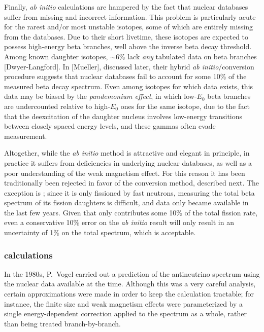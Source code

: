 \documentclass[../thesis.tex]{subfiles}
\begin{document}
Finally, \emph{ab initio} calculations are hampered by the fact that nuclear databases suffer from missing and incorrect information. This problem is particularly acute for the rarest and/or most unstable isotopes, some of which are entirely missing from the databases. Due to their short livetime, these isotopes are expected to possess high-energy beta branches, well above the inverse beta decay threshold. Among known daughter isotopes, $\sim$6\% lack \emph{any} tabulated data on beta branches [Dwyer-Langford]. In [Mueller], discussed later, their hybrid \emph{ab initio}/conversion procedure suggests that nuclear databases fail to account for some 10\% of the measured beta decay spectrum. Even among isotopes for which data exists, this data may be biased by the \emph{pandemonium effect}, in which low-$E_0$ beta branches are undercounted relative to high-$E_0$ ones for the same isotope, due to the fact that the deexcitation of the daughter nucleus involves low-energy transitions between closely spaced energy levels, and these gammas often evade measurement.

Altogether, while the \emph{ab initio} method is attractive and elegant in principle, in practice it suffers from deficiencies in underlying nuclear databases, as well as a poor understanding of the weak magnetism effect. For this reason it has been traditionally been rejected in favor of the conversion method, described next. The exception is \ureight; since it is only fissioned by fast neutrons, measuring the total beta spectrum of its fission daughters is difficult, and data only became available in the last few years. Given that \ureight only contributes some 10\% of the total fission rate, even a conservative 10\% error on the \emph{ab initio} result will only result in an uncertainty of 1\% on the total spectrum, which is acceptable.

\subsubsection{\ureight calculations}
\label{sec:vogel}

In the 1980s, P.~Vogel carried out a prediction of the \ureight antineutrino spectrum using the nuclear data available at the time. Although this was a very careful analysis, certain approximations were made in order to keep the calculation tractable; for instance, the finite size and weak magnetism effects were parameterized by a single energy-dependent correction applied to the spectrum as a whole, rather than being treated branch-by-branch.
\end{document}
